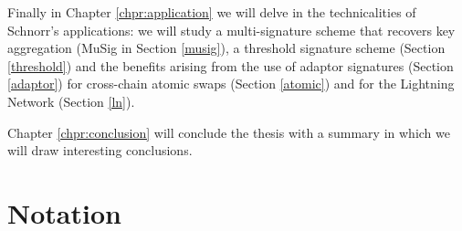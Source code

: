 \bigskip
\noindent
Finally in Chapter \ref{chpr:application} we will delve in the technicalities of Schnorr's applications: we will study a multi-signature scheme that recovers key aggregation (MuSig in Section \ref{musig}), a threshold signature scheme (Section \ref{threshold}) and the benefits arising from the use of adaptor signatures (Section \ref{adaptor}) for cross-chain atomic swaps (Section \ref{atomic}) and for the Lightning Network (Section \ref{ln}).

\bigskip
\noindent
Chapter \ref{chpr:conclusion} will conclude the thesis with a summary in which we will draw interesting conclusions.
\bigskip

\bigskip

\section{Notation}
